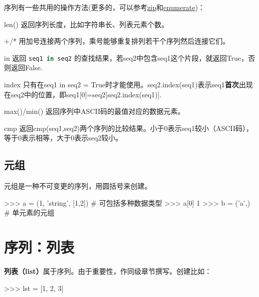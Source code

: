 \documentclass[a4paper,12pt]{report}
\newcommand{\pyline}[1]{{ \lstinline[language=Python, basicstyle=\ttfamily]{#1} }}
\newcommand{\qd}[1]{{\bfseries{#1}}}	%
\newcommand{\co}[1]{{\bfseries{#1}}}   %
\newenvironment{fead}{\begin{description}[font=\bfseries\uline]}
    {\end{description}}
\begin{document}
序列有一些共用的操作方法(更多的，可以参考\hyperref[sec:zip]{zip}和\hyperref[sec:enumerate]{enumerate})：
\begin{fead}
\item[len()] 返回序列长度，比如字符串长、列表元素个数。
\item[+/*] 用加号连接两个序列，乘号能够重复排列若干个序列然后连接它们。
\item[in] 返回\pyline{seq1 in seq2}的查找结果，若seq2中包含seq1这个片段，就返回True，否则返回False. 
\item[index] 只有在seq1 in seq2 = True时才能使用。seq2.index(seq1)表示seq1\qd{首次}出现在seq2中的位置，即seq1[0]=seq2[seq2.index(seq1)]. 
\item[max()/min()] 返回序列中ASCII码的最值对应的数据元素。
\item[cmp] 返回cmp(seq1,seq2)两个序列的比较结果。小于0表示seq1较小（ASCII码），等于0表示相等，大于0表示seq2较小。
\end{fead}

\subsection{元组}
元组是一种不可变更的序列，用圆括号来创建。
\begin{py}
>>> a = (1, 'string', [1,2])	# 可包括多种数据类型
>>> a[0]
1
>>> b = ('a',)	# 单元素的元组
\end{py}

\section{序列：列表}
\label{subsec:list}
\co{列表（list）}属于序列。由于重要性，作同级章节撰写。创建比如：
\begin{py}
>>> lst = [1, 2, 3]
\end{py}
\end{document}
